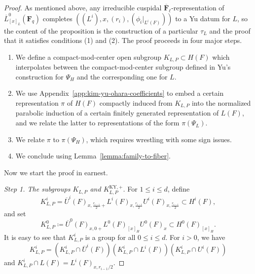 \documentclass[reqno]{amsart}
\numberwithin{equation}{subsection}
\newcommand{\F}{\mathbf{F}}
\newcommand{\ol}[1]{\overline{#1}}
\theoremstyle{remark}
\numberwithin{equation}{subsection}
\numberwithin{figure}{subsection}
\begin{document}
\begin{proof}
As mentioned above, any irreducible cuspidal $\ol\F_\ell$-representation of $\ol L^0_{[x]_L}(\F_q)$ completes $((L^i), x, (r_i), (\phi_i|_{L^i(F)}))$ to a Yu datum for $L$, so the content of the proposition is the construction of a particular $\tau_L$ and the proof that it satisfies conditions (1) and (2). The proof proceeds in four major steps.
\begin{enumerate}
\item[(Step 1)] We define a compact-mod-center open subgroup $K_{L,P} \subset H(F)$ which interpolates between the compact-mod-center subgroup defined in Yu's construction for $\Psi_H$ and the corresponding one for $L$. 

\item[(Step 2)] We use Appendix~\ref{app:kim-yu-ohara-coefficients} to embed a certain representation $\pi$ of $H(F)$ compactly induced from $K_{L,P}$ into the normalized parabolic induction of a certain finitely generated representation of $L(F)$, and we relate the latter to representations of the form $\pi(\Psi_L)$. 

\item[(Step 3)] We relate $\pi$ to $\pi(\Psi_H)$, which requires wrestling with some sign issues. 

\item[(Step 4)] We conclude using Lemma~\ref{lemma:family-to-fiber}.
\end{enumerate}
Now we start the proof in earnest. 

\emph{Step 1. The subgroups $K_{L,P}$ and $K_{L,P}^{\mathrm{KY},+}$.} For $1 \leq i\leq d$, define
\[
K_{L,P}^i=\ol U^i(F)_{x, \frac{r_{i-1}}{2}+}L^i(F)_{x,\frac{r_{i-1}}{2}}U^i(F)_{x,\frac{r_{i-1}}{2}} \subset H^i(F),
\]
and set
\begin{equation}\label{eq:KLP-depth-zero-par}
K_{L,P}^0\coloneqq\ol U^0(F)_{x,0+}L^0(F)_{[x]_H}U^0(F)_x \subset H^0(F)_{[x]_H}.
\end{equation}
It is easy to see that $K^i_{L,P}$ is a group for all $0 \leq i \leq d$.
For $i>0$, we have 
\begin{equation}\label{eq:KLP-root-decomposition}
K_{L,P}^i=(K_{L,P}^i\cap\ol U^i(F))(K_{L,P}^i\cap L^i(F))(K_{L,P}^i\cap U^i(F))
\end{equation}
and $K_{L,P}^i \cap L(F) = L^i(F)_{x,r_{i-1}/2}$.  




\end{proof}
\end{document}
